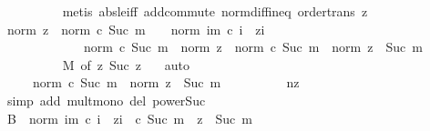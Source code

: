 \begin{isabellebody}
\ \ \ \ \ \ \ \ \isamarkupfalse%
\ {\isacharparenleft}{\kern0pt}metis\ abs{\isacharunderscore}{\kern0pt}le{\isacharunderscore}{\kern0pt}iff\ add{\isachardot}{\kern0pt}commute\ norm{\isacharunderscore}{\kern0pt}diff{\isacharunderscore}{\kern0pt}ineq\ order{\isacharunderscore}{\kern0pt}trans\ z{}{\isacharparenright}{\kern0pt}\isanewline
\ \ \ \ \ \ \isamarkupfalse%
\ {\isachardoublequoteopen}norm\ z\ {\isacharasterisk}{\kern0pt}\ norm\ {\isacharparenleft}{\kern0pt}c\ {\isacharparenleft}{\kern0pt}Suc\ m{\isacharparenright}{\kern0pt}{\isacharparenright}{\kern0pt}\ {\isacharplus}{\kern0pt}\ {}\ {\isacharasterisk}{\kern0pt}\ norm\ {\isacharparenleft}{\kern0pt}{\isasymSum}i{\isasymle}m{\isachardot}{\kern0pt}\ c\ i\ {\isacharasterisk}{\kern0pt}\ z{\isacharcircum}{\kern0pt}i{\isacharparenright}{\kern0pt}\isanewline
\ \ \ \ \ \ \ \ \ \ \ \ {\isasymle}\ norm\ {\isacharparenleft}{\kern0pt}c\ {\isacharparenleft}{\kern0pt}Suc\ m{\isacharparenright}{\kern0pt}{\isacharparenright}{\kern0pt}\ {\isacharasterisk}{\kern0pt}\ norm\ z\ {\isacharplus}{\kern0pt}\ norm\ {\isacharparenleft}{\kern0pt}c\ {\isacharparenleft}{\kern0pt}Suc\ m{\isacharparenright}{\kern0pt}{\isacharparenright}{\kern0pt}\ {\isacharasterisk}{\kern0pt}\ norm\ z\ {\isacharcircum}{\kern0pt}\ Suc\ m{\isachardoublequoteclose}\isanewline
\ \ \ \ \ \ \ \ \isamarkupfalse%
\ M\ {\isacharbrackleft}{\kern0pt}of\ z{\isacharbrackright}{\kern0pt}\ Suc\ z{}\ \ \isamarkupfalse%
\ auto\isanewline
\ \ \ \ \ \ \isamarkupfalse%
\ \isamarkupfalse%
\ {\isachardoublequoteopen}{\isachardot}{\kern0pt}{\isachardot}{\kern0pt}{\isachardot}{\kern0pt}\ {\isasymle}\ {}\ {\isacharasterisk}{\kern0pt}\ {\isacharparenleft}{\kern0pt}norm\ {\isacharparenleft}{\kern0pt}c\ {\isacharparenleft}{\kern0pt}Suc\ m{\isacharparenright}{\kern0pt}{\isacharparenright}{\kern0pt}\ {\isacharasterisk}{\kern0pt}\ norm\ z\ {\isacharcircum}{\kern0pt}\ Suc\ m{\isacharparenright}{\kern0pt}{\isachardoublequoteclose}\isanewline
\ \ \ \ \ \ \ \ \isamarkupfalse%
\ nz\ \isamarkupfalse%
\ {\isacharparenleft}{\kern0pt}simp\ add{\isacharcolon}{\kern0pt}\ mult{\isacharunderscore}{\kern0pt}mono\ del{\isacharcolon}{\kern0pt}\ power{\isacharunderscore}{\kern0pt}Suc{\isacharparenright}{\kern0pt}\isanewline
\ \ \ \ \ \ \isamarkupfalse%
\ \isamarkupfalse%
\ {\isachardoublequoteopen}B\ {\isasymle}\ norm\ {\isacharparenleft}{\kern0pt}{\isacharparenleft}{\kern0pt}{\isasymSum}i{\isasymle}m{\isachardot}{\kern0pt}\ c\ i\ {\isacharasterisk}{\kern0pt}\ z{\isacharcircum}{\kern0pt}i{\isacharparenright}{\kern0pt}\ {\isacharplus}{\kern0pt}\ c\ {\isacharparenleft}{\kern0pt}Suc\ m{\isacharparenright}{\kern0pt}\ {\isacharasterisk}{\kern0pt}\ z\ {\isacharcircum}{\kern0pt}\ Suc\ m{\isacharparenright}{\kern0pt}{\isachardoublequoteclose}\isanewline

\end{isabellebody}
